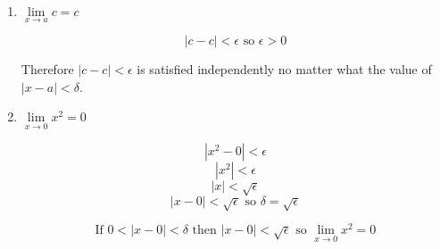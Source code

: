 \documentclass{article}
\begin{document}
\begin{enumerate}
			
		\item $\lim \limits _ {x \to a} c = c$
		
			$$|c - c| < \epsilon \text{ so } \epsilon > 0$$
			
			Therefore $|c - c| < \epsilon$ is satisfied independently no matter what the value of $|x - a| < \delta$.
			
		\item $\lim \limits _{x \to 0} x^2 = 0$
		
			$$|x^2 - 0| < \epsilon$$
			$$|x^2| < \epsilon$$
			$$|x| < \sqrt{\epsilon}$$
			$$|x - 0 | < \sqrt{\epsilon} \text{ so } \delta = \sqrt{\epsilon}$$
			
			$$\text{If } 0 < |x - 0| < \delta \text{ then } |x - 0| < \sqrt{\epsilon} \text{ so } 
			\lim \limits _{x \to 0} x^2 = 0$$
			
	\end{enumerate}
\end{document}
